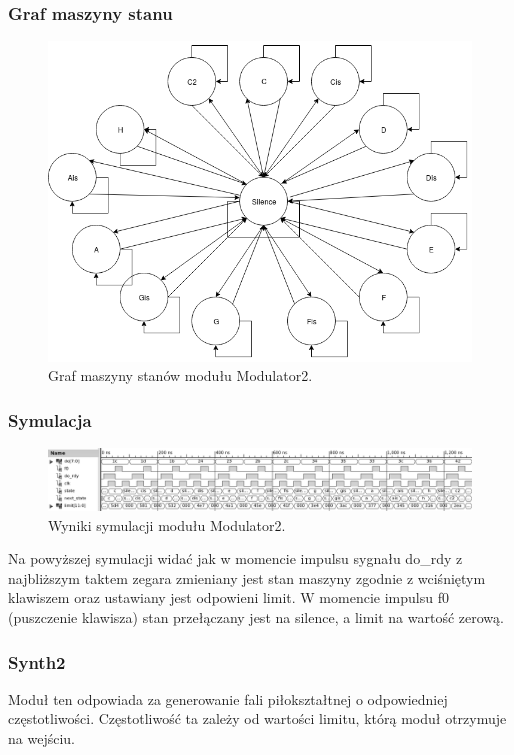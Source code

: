 \documentclass[a4paper,11pt]{article}
\begin{document}
\subsubsection*{Graf maszyny stanu}
\begin{figure}[H]
\center
\includegraphics[scale=0.6]{modulatorMaszyna.png}
\caption{Graf maszyny stanów modułu Modulator2.}
\end{figure}

\subsubsection*{Symulacja}
\begin{figure}[H]
\center
\includegraphics[scale=0.6]{modulatorsymbw.png}
\caption{Wyniki symulacji modułu Modulator2.}
\end{figure}
Na powyższej symulacji widać jak w momencie impulsu sygnału do_rdy z najbliższym taktem zegara zmieniany jest stan maszyny zgodnie z wciśniętym klawiszem oraz ustawiany jest odpowieni limit. W momencie impulsu f0 (puszczenie klawisza) stan przełączany jest na silence, a limit na wartość zerową.

\newpage
\subsubsection{Synth2}
Moduł ten odpowiada za generowanie fali piłokształtnej o odpowiedniej częstotliwości. Częstotliwość ta zależy od wartości limitu, którą moduł otrzymuje na wejściu.
\end{document}
